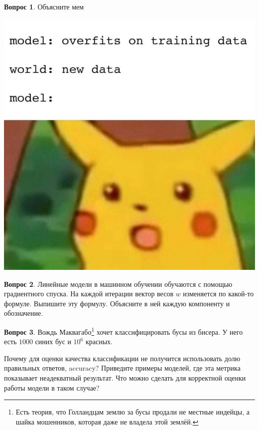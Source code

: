 \documentclass[12pt]{article}
\theoremstyle{definition}
\newtheorem{question}{Вопрос}
\begin{document}
\begin{question}
Объясните мем
\begin{center}
  \includegraphics[scale=0.3]{memes3.png}
\end{center}
\end{question}

\vspace{5cm} 


\begin{question}
Линейные модели в машинном обучении обучаются с помощью градиентного спуска. На каждой итерации вектор весов $w$ изменяется по какой-то формуле. Выпишите эту формулу. Объясните в ней каждую компоненту и обозначение. 
\end{question}


\newpage 

\begin{question}
Вождь Маквагабо\footnote{Есть теория, что Голландцам землю за бусы продали не местные индейцы, а шайка мошенников, которая даже не владела этой землёй.} хочет классифицировать бусы из бисера. У него есть $1000$ синих бус и $10^6$ красных. 

Почему для оценки качества классификации не получится использовать долю правильных ответов, accuracy? Приведите примеры моделей, где эта метрика показывает неадекватный результат. Что можно сделать для корректной оценки работы модели в таком случае? 
\end{question}
\end{document}
